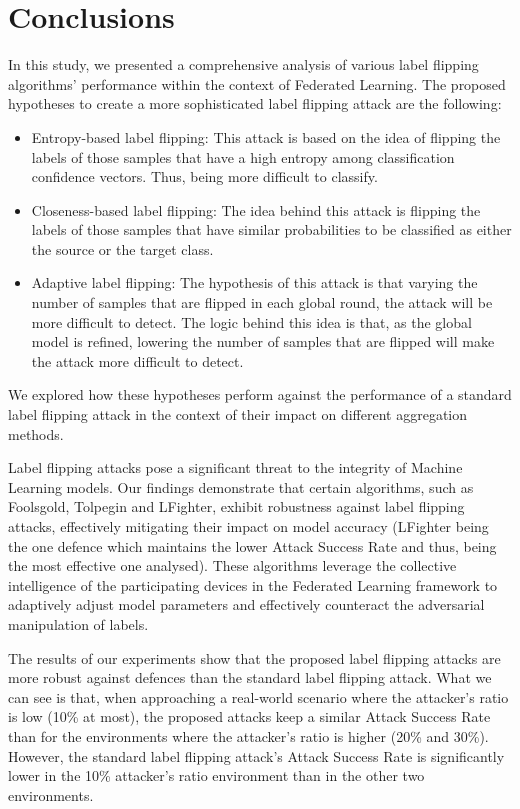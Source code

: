 \newpage
\section{Conclusions}\label{sec:conclusions}
In this study, we presented a comprehensive analysis of various label flipping algorithms' performance within the context of Federated Learning. 
The proposed hypotheses to create a more sophisticated label flipping attack are the following:
\begin{itemize}
        \item Entropy-based label flipping: This attack is based on the idea of flipping the labels of those samples that have a high entropy among classification confidence vectors. Thus, being more difficult to classify.
        \item Closeness-based label flipping: The idea behind this attack is flipping the labels of those samples that have similar probabilities to be classified as either the source or the target class.
        \item Adaptive label flipping: The hypothesis of this attack is that varying the number of samples that are flipped in each global round, the attack will be more difficult to detect. The logic behind this idea is that, as the global model is refined, lowering the number of samples that are flipped will make the attack more difficult to detect. 
\end{itemize}

We explored how these hypotheses perform against the performance of a standard label flipping attack in the context of their impact on different aggregation methods.

Label flipping attacks pose a significant threat to the integrity of Machine Learning models. Our findings demonstrate that certain algorithms, such as Foolsgold\cite{FoolsGoldPaper}, Tolpegin\cite{TolpeginPaper} and LFighter\cite{LFighter_paper}, exhibit robustness against label flipping attacks, effectively mitigating their impact on model accuracy (LFighter being the one defence which maintains the lower Attack Success Rate and thus, being the most effective one analysed). These algorithms leverage the collective intelligence of the participating devices in the Federated Learning framework to adaptively adjust model parameters and effectively counteract the adversarial manipulation of labels.

The results of our experiments show that the proposed label flipping attacks are more robust against defences than the standard label flipping attack. What we can see is that, when approaching a real-world scenario where the attacker's ratio is low (10\% at most), the proposed attacks keep a similar Attack Success Rate than for the environments where the attacker's ratio is higher (20\% and 30\%). However, the standard label flipping attack's Attack Success Rate is significantly lower in the 10\% attacker's ratio environment than in the other two environments.


